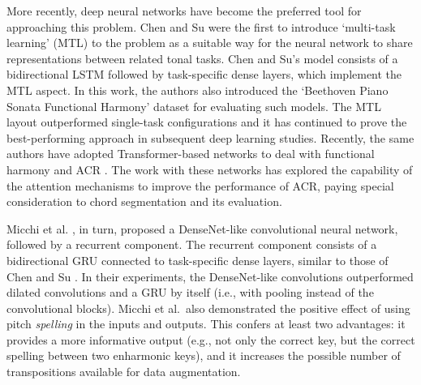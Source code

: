 More recently, deep neural networks have become the
preferred tool for approaching this problem. Chen and Su
\cite{chen2018functional} were the first to introduce
`multi-task learning' (MTL) \cite{ruder2017overview} to the
problem as a suitable way for the neural network to share
representations between related tonal tasks. Chen and Su's
model consists of a bidirectional LSTM
\cite{hochreiter1997long} followed by task-specific dense
layers, which implement the MTL aspect. In this work, the
authors also introduced the `Beethoven Piano Sonata
Functional Harmony' dataset for evaluating such models. The
MTL layout outperformed single-task configurations and it
has continued to prove the best-performing approach in
subsequent deep learning studies. Recently, the same authors
have adopted Transformer-based networks to deal with
functional harmony and ACR \cite{chen2019harmony,
chen2021attend}. The work with these networks has explored
the capability of the attention mechanisms to improve the
performance of ACR, paying special consideration to chord
segmentation and its evaluation.

Micchi et al. \cite{micchi2020not}, in turn, proposed a
DenseNet-like \cite{huang2017densely} convolutional neural
network, followed by a recurrent component. The recurrent
component consists of a bidirectional GRU
\cite{cho2014learning} connected to task-specific dense
layers, similar to those of Chen and Su
\cite{chen2018functional}. In their experiments, the
DenseNet-like convolutions outperformed dilated convolutions
and a GRU by itself (i.e., with pooling instead of the
convolutional blocks). Micchi et al.~also demonstrated the
positive effect of using pitch \textit{spelling} in the
inputs and outputs. This confers at least two advantages: it
provides a more informative output (e.g., not only the
correct key, but the correct spelling between two enharmonic
keys), and it increases the possible number of
transpositions available for data augmentation.

